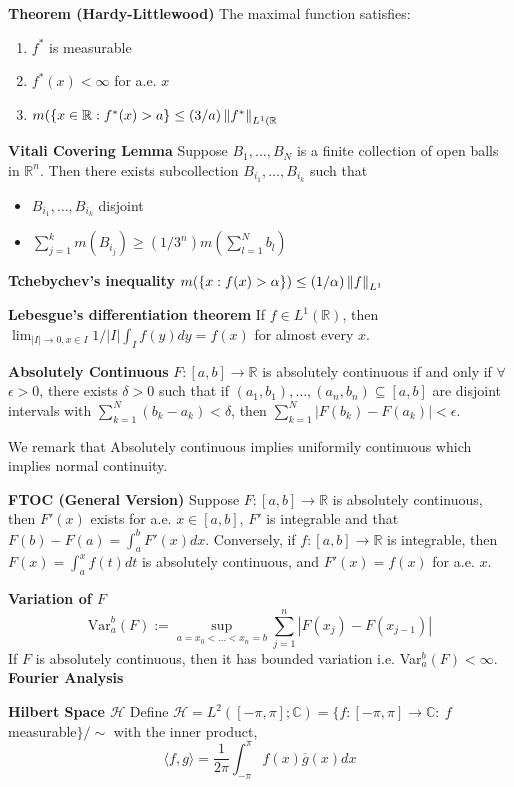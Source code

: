 \documentclass[6pt,landscape]{article}
\begin{document}
\begin{multicols*}{3}
\textbf{Theorem (Hardy-Littlewood)} The maximal function satisfies:
\begin{enumerate}
	\item $f^{*}$ is measurable
	\item $f^{*}(x) < \infty$ for a.e. $x$
	\item $m(\{x\in\mathbb{R}: f^{*}(x)>a\}\leq (3/a) \left\lVert f^{*}\right\rVert_{L^1(\mathbb{R}}$
\end{enumerate}

\textbf{Vitali Covering Lemma} Suppose $B_1,\hdots, B_N$ is a finite collection of open balls in $\mathbb{R}^n$. Then there exists subcollection $B_{i_1},\hdots,B_{i_k}$ such that
\begin{itemize}
	\item $B_{i_1},\hdots,B_{i_k}$ disjoint
	\item $\sum_{j=1}^k m(B_{i_j}) \geq (1/3^n)m(\sum_{l=1}^N b_l)$ 
\end{itemize}

\textbf{Tchebychev's inequality} $m(\{x: f(x)>\alpha\}) \leq (1/\alpha)\left\lVert f\right\rVert_{L^1}$

\textbf{Lebesgue's differentiation theorem} If $f\in L^1(\mathbb{R})$, then $\lim_{|I|\to 0, x\in I} 1/|I|\int_I f(y)dy = f(x)$ for almost every $x$.

\textbf{Absolutely Continuous} $F:[a,b]\to \mathbb{R}$ is absolutely continuous if and only if $\forall$ $\epsilon>0$, there exists $\delta>0$ such that if 
$(a_1,b_1),\hdots,(a_n,b_n)\subseteq [a,b]$ are disjoint intervals with $\sum_{k=1}^N (b_k-a_k) < \delta$, then $\sum_{k=1}^N |F(b_k)-F(a_k)|<\epsilon$.

We remark that Absolutely continuous implies uniformily continuous which implies normal continuity.

\textbf{FTOC (General Version)} Suppose $F:[a,b]\to\mathbb{R}$ is absolutely continuous, then $F'(x)$ exists for a.e. $x\in[a,b]$, $F'$ is integrable and that $F(b)-F(a) = \int_a^b F'(x)dx$. Conversely,
if $f:[a,b]\to\mathbb{R}$ is integrable, then $F(x) = \int_a^x f(t)dt$ is absolutely continuous, and $F'(x)=f(x)$ for a.e. $x$.

\textbf{Variation of $F$} \[ \text{Var}_a^b(F) := \sup_{a=x_0<\hdots<x_n=b} \sum_{j=1}^n |F(x_j)-F(x_{j-1})|\]  
If $F$ is absolutely continuous, then it has bounded variation i.e. Var$_a^b(F) < \infty$.\\

\textbf{Fourier Analysis}

\textbf{Hilbert Space $\mathcal{H}$} Define $\mathcal{H} = L^2([-\pi,\pi]; \mathbb{C}) = \{f: [-\pi,\pi]\to\mathbb{C}:\: f$ measurable$\}/\sim$ with the inner product,
\[ \langle f,g\rangle = \frac{1}{2\pi} \int_{-\pi}^{\pi} f(x)\overline{g}(x)dx \]


\end{multicols*}
\end{document}

